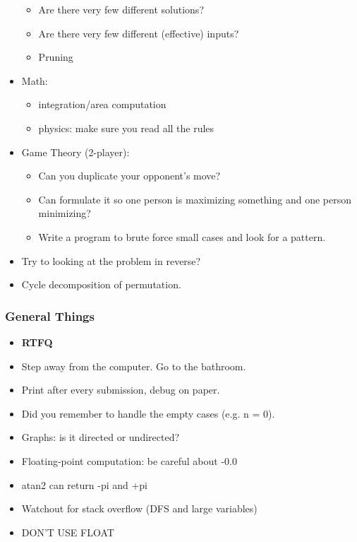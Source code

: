 \documentclass[landscape,10pt]{article}
\begin{document}
\begin{multicols*}{2}
\begin{itemize}
   \begin{itemize}
   \item Are there very few different solutions?
   \item Are there very few different (effective) inputs?
   \item Pruning
   \end{itemize}
 \item Math:
   \begin{itemize}
   \item integration/area computation
   \item physics: make sure you read all the rules
   \end{itemize}
 \item Game Theory (2-player):
  \begin{itemize}
   \item Can you duplicate your opponent's move?
   \item Can formulate it so one person is maximizing something and one person minimizing?
   \item Write a program to brute force small cases and look for a pattern.
   \end{itemize}
 \item Try to looking at the problem in reverse?
 \item Cycle decomposition of permutation.
\end{itemize}

\subsubsection*{General Things}
 
\begin{itemize}
 \item {\color{red} \textbf{RTFQ} }
 \item Step away from the computer.  Go to the bathroom.
 \item Print after every submission, debug on paper.
 \item Did you remember to handle the empty cases (e.g. n = 0).
 \item Graphs: is it directed or undirected?
 \item Floating-point computation: be careful about -0.0
 \item atan2 can return -pi and +pi
 \item Watchout for stack overflow (DFS and large variables)
 \item DON'T USE FLOAT
\end{itemize}


\end{multicols*}
\end{document}

